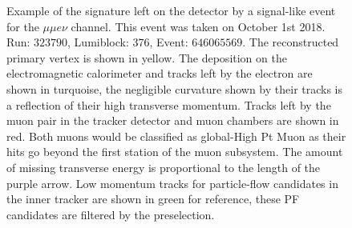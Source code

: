 \begin{figure}
  \centering
  \vfil
  \caption{Example of the signature left on the detector by a signal-like event
    for the $\mu\mu e \nu$ channel. This event was taken on October 1st 2018.
    Run: $323790$, Lumiblock: $376$, Event: $646065569$. The reconstructed primary vertex is shown in yellow.
    The deposition on the electromagnetic calorimeter and tracks left by the electron are shown in turquoise,
    the negligible curvature shown by their tracks is a reflection of their high transverse momentum.
    Tracks left by the muon pair in the tracker detector and muon chambers are shown in red.
    Both muons would be classified as global-High Pt Muon as their hits
    go beyond the first station of the muon subsystem. The amount of missing
    transverse energy is proportional to the length of the purple arrow. Low momentum
    tracks for particle-flow candidates in the inner tracker are shown in green for
    reference, these PF candidates are filtered by the preselection. }
  \label{fig:Fireworks_mumuev}
\end{figure}

